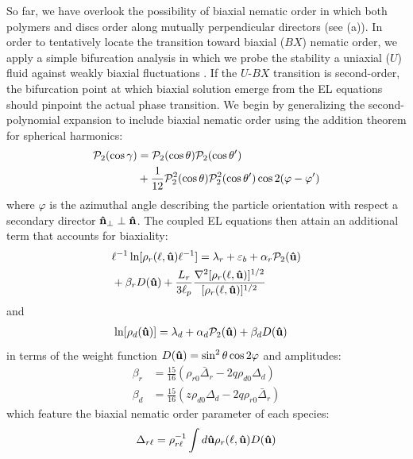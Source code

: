 \begin{subappendices}
So far, we have overlook the possibility of biaxial nematic order in which both polymers and discs order along mutually perpendicular directors (see (a)).
In order to tentatively locate the transition toward biaxial ($BX$) nematic order, we  apply a simple bifurcation analysis in which we probe the stability a uniaxial ($U$) fluid against weakly biaxial fluctuations \cite{kayser,stroobants1984}. If the $U$-$BX$ transition is second-order, the bifurcation point at which biaxial solution emerge from the EL equations should pinpoint the actual phase transition.  We begin by generalizing the second-polynomial expansion  to include biaxial nematic order using the addition theorem for spherical harmonics:
\begin{align}
{\mathcal P}_{2}( \cos \gamma ) &= {\mathcal P}_{2}(\cos \theta) {\mathcal P}_{2}(\cos \theta^{\prime})  \nonumber \\ 
& + \frac{1}{12} {\mathcal P}_{2}^{2}(\cos \theta) {\mathcal P}_{2}^{2}(\cos \theta^{\prime}) \cos 2 (\varphi - \varphi^{\prime})
\end{align}
where $\varphi$ is the azimuthal angle describing the particle orientation  with respect a secondary director ${\bf \hat{n}}_{\perp} \perp {\bf \hat{n}}$. The coupled EL equations then attain an additional term that accounts for biaxiality: 
\begin{align}
&  \ell^{-1} \ln [  \rho_{r} (\ell, {\bf \hat{u}} ) \ell^{-1} ]   = \lambda_{r}    + \varepsilon_{b}  +  \alpha_{r}  {\mathcal P}_{2}({\bf \hat{u}} ) \nonumber \\ 
& +  \beta_{r } D({\bf \hat{u}})   +  \frac{L_{r}}{3\ell_{p}} \frac{\nabla^{2} [ \rho_{r} (\ell , {\bf \hat{u}})]^{1/2}}{ [ \rho_{r} (\ell , {\bf \hat{u}})]^{1/2} }
\label{lnrhorbiax}
\end{align}
and
\begin{align}
\ln [  \rho_{d} ({\bf \hat{u}} )] & = \lambda_{d}  + \alpha_{d} {\mathcal P}_{2}({\bf \hat{u}})  + \beta_{d} D({\bf \hat{u}} )  
\label{lndbiax}
\end{align}
in terms of the  weight function $D({\bf \hat{u}}) = \sin^{2} \theta  \cos 2 \varphi $ and amplitudes: 
\begin{align}
\beta_{r} &=  \frac{15 }{16}  ( \rho_{r0} \bar{\Delta}_{r}  - 2q  \rho_{d0}  \Delta_{d} )  \nonumber \\
\beta_{d} &=   \frac{15 }{16}  (z \rho_{d0}  \Delta_{d}  - 2 q \rho_{r0}  \bar{\Delta}_{r} )
\label{alphabetabiax}
\end{align}
which feature the biaxial nematic order parameter of each species:
\begin{align}
\Delta_{r \ell} &= \rho_{r \ell}^{-1} \int d \oma \rho_{r}(\ell, \oma) D (\oma) \nonumber \\

\end{align}
\end{subappendices}
